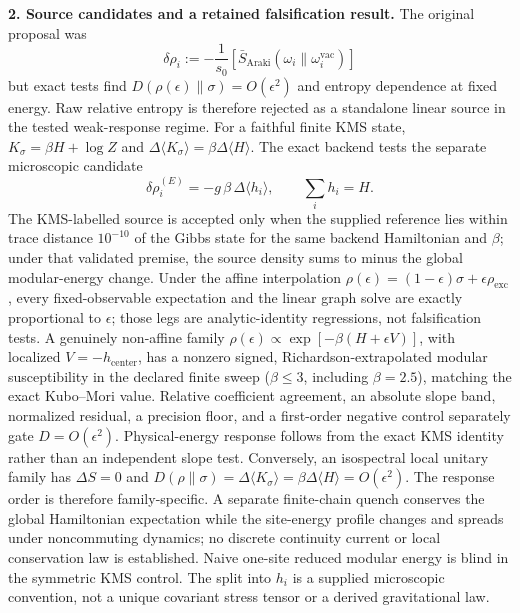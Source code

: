 \documentclass[reprint, amsmath, amssymb, aps, prd]{revtex4-2}
\begin{document}
\textbf{2. Source candidates and a retained falsification result.}
The original proposal was
\begin{equation}
\delta\rho_i := -\frac{1}{s_0} \left[ \bar{S}_{\text{Araki}}(\omega_{i} \| \omega_{i}^{\text{vac}}) \right]
\end{equation}
but exact tests find $D(\rho(\epsilon)\|\sigma)=O(\epsilon^2)$ and entropy dependence at fixed energy. Raw relative entropy is therefore rejected as a standalone linear source in the tested weak-response regime. For a faithful finite KMS state, $K_\sigma=\beta H+\log Z$ and $\Delta\langle K_\sigma\rangle=\beta\Delta\langle H\rangle$. The exact backend tests the separate microscopic candidate
\begin{equation}
\delta\rho_i^{(E)}=-g\,\beta\,\Delta\langle h_i\rangle,
\qquad \sum_i h_i=H.
\end{equation}
The KMS-labelled source is accepted only when the supplied reference lies within trace distance $10^{-10}$ of the Gibbs state for the same backend Hamiltonian and $\beta$; under that validated premise, the source density sums to minus the global modular-energy change. Under the affine interpolation $\rho(\epsilon)=(1-\epsilon)\sigma+\epsilon\rho_{\mathrm{exc}}$, every fixed-observable expectation and the linear graph solve are exactly proportional to $\epsilon$; those legs are analytic-identity regressions, not falsification tests. A genuinely non-affine family $\rho(\epsilon)\propto\exp[-\beta(H+\epsilon V)]$, with localized $V=-h_{\mathrm{center}}$, has a nonzero signed, Richardson-extrapolated modular susceptibility in the declared finite sweep ($\beta\leq3$, including $\beta=2.5$), matching the exact Kubo--Mori value. Relative coefficient agreement, an absolute slope band, normalized residual, a precision floor, and a first-order negative control separately gate $D=O(\epsilon^2)$. Physical-energy response follows from the exact KMS identity rather than an independent slope test. Conversely, an isospectral local unitary family has $\Delta S=0$ and $D(\rho\|\sigma)=\Delta\langle K_\sigma\rangle=\beta\Delta\langle H\rangle=O(\epsilon^2)$. The response order is therefore family-specific. A separate finite-chain quench conserves the global Hamiltonian expectation while the site-energy profile changes and spreads under noncommuting dynamics; no discrete continuity current or local conservation law is established. Naive one-site reduced modular energy is blind in the symmetric KMS control. The split into $h_i$ is a supplied microscopic convention, not a unique covariant stress tensor or a derived gravitational law.
\end{document}
